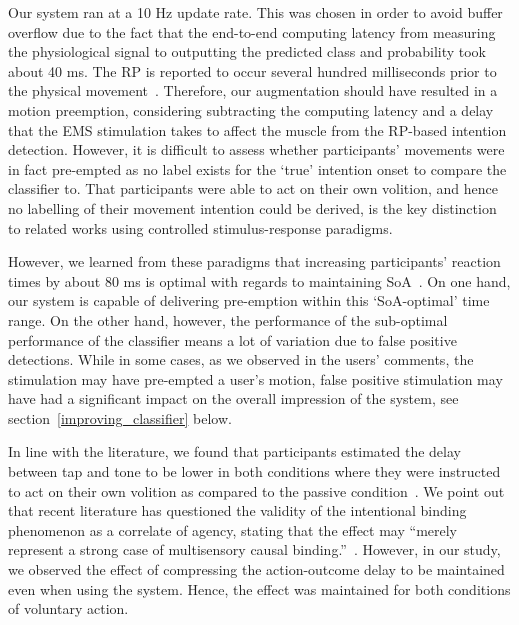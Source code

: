 Our system ran at a 10 Hz update rate. This was chosen in order to avoid buffer overflow due to the fact that the end-to-end computing latency from measuring the physiological signal to outputting the predicted class and probability took about 40 ms. The RP is reported to occur several hundred milliseconds prior to the physical movement~\cite{Schurger2021-vp}. Therefore, our augmentation should have resulted in a motion preemption, considering subtracting the computing latency and a delay that the EMS stimulation takes to affect the muscle from the RP-based intention detection. However, it is difficult to assess whether participants' movements were in fact pre-empted as no label exists for the `true' intention onset to compare the classifier to. That participants were able to act on their own volition, and hence no labelling of their movement intention could be derived, is the key distinction to related works using controlled stimulus-response paradigms.

However, we learned from these paradigms that increasing participants' reaction times by about 80 ms is optimal with regards to maintaining SoA~\cite{Kasahara2019-sk}. On one hand, our system is capable of delivering pre-emption within this `SoA-optimal' time range. On the other hand, however, the performance of the sub-optimal performance of the classifier means a lot of variation due to false positive detections. While in some cases, as we observed in the users' comments, the stimulation may have pre-empted a user's motion, false positive stimulation may have had a significant impact on the overall impression of the system, see section~\ref{improving_classifier} below.

In line with the literature, we found that participants estimated the delay between tap and tone to be lower in both conditions where they were instructed to act on their own volition as compared to the passive condition~\cite{Moore2012-dk}. We point out that recent literature has questioned the validity of the intentional binding phenomenon as a correlate of agency, stating that the effect may ``merely represent a strong case of multisensory causal binding.''~\cite{Suzuki2019-pi, Gutzeit2023-ei, Hoerl2020-my}. However, in our study, we observed the effect of compressing the action-outcome delay to be maintained even when using the system. Hence, the effect was maintained for both conditions of voluntary action.

